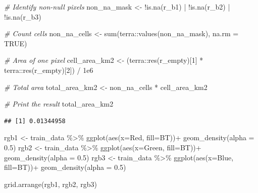 \documentclass[
]{article}
\newenvironment{Shaded}{\begin{snugshade}}{\end{snugshade}}
\newcommand{\AttributeTok}[1]{\textcolor[rgb]{0.77,0.63,0.00}{#1}}
\newcommand{\CommentTok}[1]{\textcolor[rgb]{0.56,0.35,0.01}{\textit{#1}}}
\newcommand{\ConstantTok}[1]{\textcolor[rgb]{0.00,0.00,0.00}{#1}}
\newcommand{\DecValTok}[1]{\textcolor[rgb]{0.00,0.00,0.81}{#1}}
\newcommand{\FloatTok}[1]{\textcolor[rgb]{0.00,0.00,0.81}{#1}}
\newcommand{\FunctionTok}[1]{\textcolor[rgb]{0.00,0.00,0.00}{#1}}
\newcommand{\NormalTok}[1]{#1}
\newcommand{\OtherTok}[1]{\textcolor[rgb]{0.56,0.35,0.01}{#1}}
\newcommand{\SpecialCharTok}[1]{\textcolor[rgb]{0.00,0.00,0.00}{#1}}
\begin{document}
\begin{Shaded}
\begin{Highlighting}[]
\CommentTok{\# Identify non{-}null pixels}
\NormalTok{non\_na\_mask }\OtherTok{\textless{}{-}} \SpecialCharTok{!}\FunctionTok{is.na}\NormalTok{(r\_b1) }\SpecialCharTok{|} \SpecialCharTok{!}\FunctionTok{is.na}\NormalTok{(r\_b2) }\SpecialCharTok{|} \SpecialCharTok{!}\FunctionTok{is.na}\NormalTok{(r\_b3)}

\CommentTok{\# Count cells}
\NormalTok{non\_na\_cells }\OtherTok{\textless{}{-}} \FunctionTok{sum}\NormalTok{(terra}\SpecialCharTok{::}\FunctionTok{values}\NormalTok{(non\_na\_mask), }\AttributeTok{na.rm =} \ConstantTok{TRUE}\NormalTok{)}

\CommentTok{\# Area of one pixel}
\NormalTok{cell\_area\_km2 }\OtherTok{\textless{}{-}}\NormalTok{ (terra}\SpecialCharTok{::}\FunctionTok{res}\NormalTok{(r\_empty)[}\DecValTok{1}\NormalTok{] }\SpecialCharTok{*}\NormalTok{ terra}\SpecialCharTok{::}\FunctionTok{res}\NormalTok{(r\_empty)[}\DecValTok{2}\NormalTok{]) }\SpecialCharTok{/} \FloatTok{1e6}

\CommentTok{\# Total area}
\NormalTok{total\_area\_km2 }\OtherTok{\textless{}{-}}\NormalTok{ non\_na\_cells }\SpecialCharTok{*}\NormalTok{ cell\_area\_km2}

\CommentTok{\# Print the result}
\NormalTok{total\_area\_km2}
\end{Highlighting}
\end{Shaded}

\begin{verbatim}
## [1] 0.01344958
\end{verbatim}

\begin{Shaded}
\begin{Highlighting}[]
\NormalTok{rgb1 }\OtherTok{\textless{}{-}}\NormalTok{ train\_data }\SpecialCharTok{\%\textgreater{}\%} 
  \FunctionTok{ggplot}\NormalTok{(}\FunctionTok{aes}\NormalTok{(}\AttributeTok{x=}\NormalTok{Red, }\AttributeTok{fill=}\NormalTok{BT))}\SpecialCharTok{+}
  \FunctionTok{geom\_density}\NormalTok{(}\AttributeTok{alpha =} \FloatTok{0.5}\NormalTok{)}
\NormalTok{rgb2 }\OtherTok{\textless{}{-}}\NormalTok{ train\_data }\SpecialCharTok{\%\textgreater{}\%} 
  \FunctionTok{ggplot}\NormalTok{(}\FunctionTok{aes}\NormalTok{(}\AttributeTok{x=}\NormalTok{Green, }\AttributeTok{fill=}\NormalTok{BT))}\SpecialCharTok{+}
  \FunctionTok{geom\_density}\NormalTok{(}\AttributeTok{alpha =} \FloatTok{0.5}\NormalTok{)}
\NormalTok{rgb3 }\OtherTok{\textless{}{-}}\NormalTok{ train\_data }\SpecialCharTok{\%\textgreater{}\%} 
  \FunctionTok{ggplot}\NormalTok{(}\FunctionTok{aes}\NormalTok{(}\AttributeTok{x=}\NormalTok{Blue, }\AttributeTok{fill=}\NormalTok{BT))}\SpecialCharTok{+}
  \FunctionTok{geom\_density}\NormalTok{(}\AttributeTok{alpha =} \FloatTok{0.5}\NormalTok{)}

\FunctionTok{grid.arrange}\NormalTok{(rgb1, rgb2, rgb3)}
\end{Highlighting}
\end{Shaded}
\end{document}
